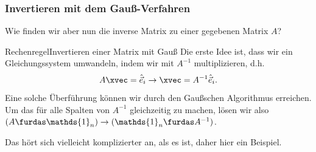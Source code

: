 \subsubsection{Invertieren mit dem Gauß-Verfahren}
Wie finden wir aber nun die inverse Matrix zu einer gegebenen Matrix $A$?
\begin{Satz}
{Rechenregel}{Invertieren einer Matrix mit Gauß}
Die erste Idee ist, dass wir ein Gleichungssystem umwandeln, indem wir mit $A^{-1}$ multiplizieren, d.h.
\begin{equation*}
    A\xvec=\Hat{\Vec{e}}_i\to \xvec=A^{-1}\Hat{\Vec{e}}_i.
\end{equation*}
Eine solche Überführung können wir durch den Gaußschen Algorithmus erreichen.\\
Um das für alle Spalten von $A^{-1}$ gleichzeitig zu machen, lösen wir also $(A\furdas\mathds{1}_n)\to(\mathds{1}_n\furdas A^{-1})$.
\end{Satz}
Das hört sich vielleicht komplizierter an, als es ist, daher hier ein Beispiel.
